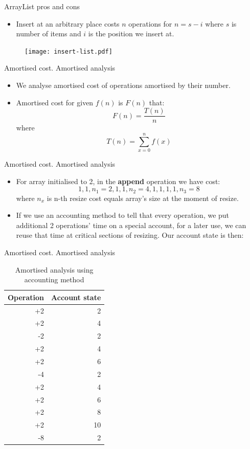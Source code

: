 \documentclass{beamer}
\begin{document}
\begin{frame}{ArrayList pros and cons}
    \begin{itemize}
        \item Insert at an arbitrary place costs $n$ operations for $n=s-i$ where $s$ is number of items and $i$ is the position we insert at.
    \end{itemize}
    \begin{figure}[htbp]
    \centering
        \texttt{[image: insert-list.pdf]}
    \label{fig:insert-list}
    \end{figure}
\end{frame}

\begin{frame}{Amortised cost. Amortised analysis}

\begin{itemize}
\item We analyse amortised cost of operations amortised by their number.
\item Amortised cost for given $f(n)$ is $F(n)$ that: $$F(n)=\frac{T(n)}{n}$$
where
$$T(n)=\sum_{x=0}^{n}f(x)$$
\end{itemize}

\end{frame}

\begin{frame}{Amortised cost. Amortised analysis}

\begin{itemize}
\item For array initialised to 2, in the \textbf{append} operation we have cost:
$$1,1,n_1=2,1,1,n_2=4,1,1,1,1,n_3=8$$
where $n_x$ is n-th resize cost equals array's size at the moment of resize.
\item If we use an accounting method to tell that every operation, we put additional 2 operations' time on a special account, for a later use, we can reuse that time at critical sections of resizing. Our account state is then:
\end{itemize}

\end{frame}

\begin{frame}{Amortised cost. Amortised analysis}

\begin{table}
\centering
\begin{tabular}{r|r}
Operation & Account state \\\hline
+2 & 2 \\
+2 & 4 \\
-2 & 2 \\
+2 & 4 \\
+2 & 6 \\
-4 & 2 \\
+2 & 4 \\
+2 & 6 \\
+2 & 8 \\
+2 & 10 \\
-8 & 2 \\\hline
\end{tabular}
\caption{\label{tab:widgets}Amortised analysis using accounting method}
\end{table}

\end{frame}
\end{document}
